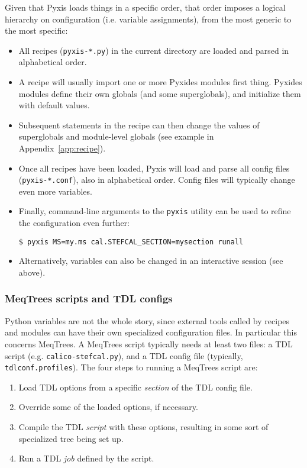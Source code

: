 \documentclass[a4paper,10pt]{article}
\begin{document}
Given that Pyxis loads things in a specific order, that order imposes a logical hierarchy on configuration (i.e. variable assignments), from the most generic to the most specific:

\begin{itemize}
  \item All recipes ({\tt pyxis-*.py}) in the current directory are loaded and parsed in alphabetical order. 
  \item A recipe will usually import one or more Pyxides modules first thing. Pyxides modules define their own globals (and some superglobals), and initialize them with default values.
  \item Subsequent statements in the recipe can then change the values of superglobals and module-level globals (see example in Appendix~\ref{app:recipe}).
  \item Once all recipes have been loaded, Pyxis will load and parse all config files ({\tt pyxis-*.conf}), also in alphabetical 
  order. Config files will typically change even more variables.
  \item Finally, command-line arguments to the {\tt pyxis} utility can be used to refine the configuration even further:
\begin{verbatim}
$ pyxis MS=my.ms cal.STEFCAL_SECTION=mysection runall
\end{verbatim}
  \item Alternatively, variables can also be changed in an interactive session (see above).\
\end{itemize}

\subsubsection{MeqTrees scripts and TDL configs}

Python variables are not the whole story, since external tools called by recipes and modules can have their own specialized configuration files. In particular this concerns MeqTrees. A MeqTrees script typically needs at least two files: a TDL script (e.g. {\tt calico-stefcal.py}), and a TDL config file (typically, {\tt tdlconf.profiles}). The four steps to running a MeqTrees script are:

\begin{enumerate}
  \item Load TDL options from a specific {\em section} of the TDL config file.
  \item Override some of the loaded options, if necessary.
  \item Compile the TDL {\em script} with these options, resulting in some sort of specialized tree being set up.
  \item Run a TDL {\em job} defined by the script.
\end{enumerate}
\end{document}
